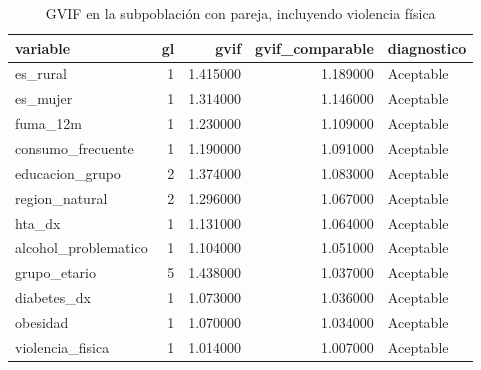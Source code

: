 \begin{table}[htbp]
\caption{GVIF en la subpoblación con pareja, incluyendo violencia física}
\label{tab:tabla_05d_gvif_subpoblacion}
\begin{tabular}{lrrrl}
\toprule
variable & gl & gvif & gvif\_comparable & diagnostico \\
\midrule
es\_rural & 1 & 1.415000 & 1.189000 & Aceptable \\
es\_mujer & 1 & 1.314000 & 1.146000 & Aceptable \\
fuma\_12m & 1 & 1.230000 & 1.109000 & Aceptable \\
consumo\_frecuente & 1 & 1.190000 & 1.091000 & Aceptable \\
educacion\_grupo & 2 & 1.374000 & 1.083000 & Aceptable \\
region\_natural & 2 & 1.296000 & 1.067000 & Aceptable \\
hta\_dx & 1 & 1.131000 & 1.064000 & Aceptable \\
alcohol\_problematico & 1 & 1.104000 & 1.051000 & Aceptable \\
grupo\_etario & 5 & 1.438000 & 1.037000 & Aceptable \\
diabetes\_dx & 1 & 1.073000 & 1.036000 & Aceptable \\
obesidad & 1 & 1.070000 & 1.034000 & Aceptable \\
violencia\_fisica & 1 & 1.014000 & 1.007000 & Aceptable \\
\bottomrule
\end{tabular}
\end{table}
